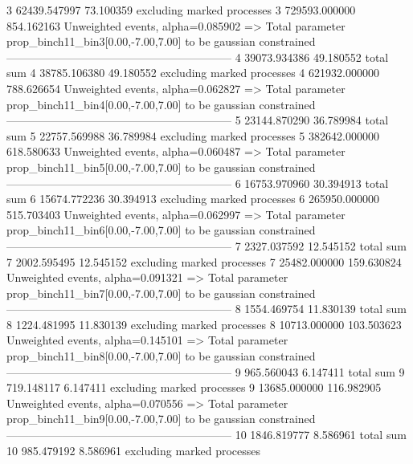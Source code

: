 3          62439.547997    73.100359       excluding marked processes    
3          729593.000000   854.162163      Unweighted events, alpha=0.085902
  => Total parameter prop_binch11_bin3[0.00,-7.00,7.00] to be gaussian constrained
------------------------------------------------------------
4          39073.934386    49.180552       total sum                     
4          38785.106380    49.180552       excluding marked processes    
4          621932.000000   788.626654      Unweighted events, alpha=0.062827
  => Total parameter prop_binch11_bin4[0.00,-7.00,7.00] to be gaussian constrained
------------------------------------------------------------
5          23144.870290    36.789984       total sum                     
5          22757.569988    36.789984       excluding marked processes    
5          382642.000000   618.580633      Unweighted events, alpha=0.060487
  => Total parameter prop_binch11_bin5[0.00,-7.00,7.00] to be gaussian constrained
------------------------------------------------------------
6          16753.970960    30.394913       total sum                     
6          15674.772236    30.394913       excluding marked processes    
6          265950.000000   515.703403      Unweighted events, alpha=0.062997
  => Total parameter prop_binch11_bin6[0.00,-7.00,7.00] to be gaussian constrained
------------------------------------------------------------
7          2327.037592     12.545152       total sum                     
7          2002.595495     12.545152       excluding marked processes    
7          25482.000000    159.630824      Unweighted events, alpha=0.091321
  => Total parameter prop_binch11_bin7[0.00,-7.00,7.00] to be gaussian constrained
------------------------------------------------------------
8          1554.469754     11.830139       total sum                     
8          1224.481995     11.830139       excluding marked processes    
8          10713.000000    103.503623      Unweighted events, alpha=0.145101
  => Total parameter prop_binch11_bin8[0.00,-7.00,7.00] to be gaussian constrained
------------------------------------------------------------
9          965.560043      6.147411        total sum                     
9          719.148117      6.147411        excluding marked processes    
9          13685.000000    116.982905      Unweighted events, alpha=0.070556
  => Total parameter prop_binch11_bin9[0.00,-7.00,7.00] to be gaussian constrained
------------------------------------------------------------
10         1846.819777     8.586961        total sum                     
10         985.479192      8.586961        excluding marked processes    
